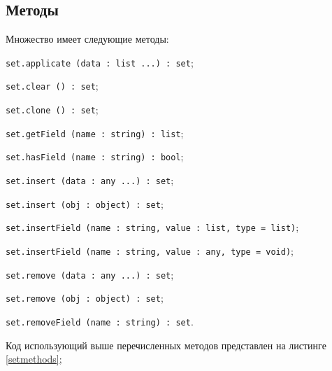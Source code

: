\subsection{Методы}

Множество имеет следующие методы:
\begin{icItems}
\item \lstinline|set.applicate (data : list ...) : set|;
\item \lstinline|set.clear () : set|;
\item \lstinline|set.clone () : set|;
\item \lstinline|set.getField (name : string) : list|;
\item \lstinline|set.hasField (name : string) : bool|;
\item \lstinline|set.insert (data : any ...) : set|;
\item \lstinline|set.insert (obj : object) : set|;
\item \lstinline|set.insertField (name : string, value : list, type = list)|;
\item \lstinline|set.insertField (name : string, value : any, type = void)|;
\item \lstinline|set.remove (data : any ...) : set|;
\item \lstinline|set.remove (obj : object) : set|;
\item \lstinline|set.removeField (name : string) : set|.
\end{icItems}

Код использующий выше перечисленных методов представлен на листинге \ref{setmethods};

